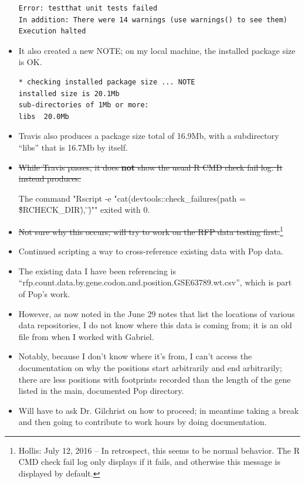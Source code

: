 \documentclass[12pt,hyperref]{labbook}
\newcommand{\sep}{\discretionary{}{}{}} %
\begin{document}
\begin{itemize}
\begin{minipage}{\linewidth}
\begin{lstlisting}
Error: testthat unit tests failed
In addition: There were 14 warnings (use warnings() to see them)
Execution halted
\end{lstlisting}
\end{minipage}
    
    \item It also created a new NOTE; on my local machine, the installed package size is OK.
    
\noindent\begin{minipage}{\linewidth}
\begin{lstlisting}
* checking installed package size ... NOTE
installed size is 20.1Mb
sub-directories of 1Mb or more:
libs  20.0Mb
\end{lstlisting}
\end{minipage}
    
    \item Travis also produces a package size total of 16.9Mb, with a subdirectory \enquote{libs} that is 16.7Mb by itself.
    \item \sout{While Travis passes, it does \textbf{not} show the usual R CMD check fail log. It instead produces:}

\begin{verbquote}
The command "Rscript -e "cat(devtools::check_failures(path = \"\${RCHECK_DIR}\"), \"\n\")"" exited with 0.
\end{verbquote}
    
    \item \sout{Not sure why this occurs; will try to work on the RFP data testing first.}\footnote{Hollis: July 12, 2016 -- In retrospect, this seems to be normal behavior. The R CMD check fail log only displays if it fails, and otherwise this message is displayed by default.\label{fn:TravisError}}
    \item Continued scripting a way to cross-reference existing data with Pop data.
    \item The existing data I have been referencing is \enquote{rfp\sep .\sep count\sep .\sep data\sep .\sep by\sep .\sep gene\sep .\sep codon\sep .\sep and\sep .\sep position\sep .\sep GSE63789\sep .\sep wt\sep .\sep csv}, which is part of Pop's work.
    \item However, as now noted in the June 29 notes that list the locations of various data repositories, I do not know where this data is coming from; it is an old file from when I worked with Gabriel.
    \item Notably, because I don't know where it's from, I can't access the documentation on why the positions start arbitrarily and end arbitrarily; there are less positions with footprints recorded than the length of the gene listed in the main, documented Pop directory.
    \item Will have to ask Dr. Gilchrist on how to proceed; in meantime taking a break and then going to contribute to work hours by doing documentation.
\end{itemize}
\end{document}
